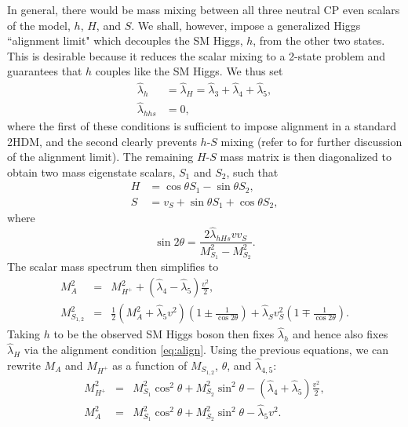 In general, there would be mass mixing between all three neutral CP even scalars of the model, $h$, $H$, and $S$. We shall, however, impose a generalized Higgs ``alignment limit" which decouples the SM Higgs, $h$, from the other two states. This is desirable because it reduces the scalar mixing to a 2-state problem and guarantees that $h$ couples like the SM Higgs. We thus set
\begin{align}
  \label{eq:align}  \hat{\lambda}_h &= \hat{\lambda}_H = \hat{\lambda}_3 + \hat{\lambda}_4 + \hat{\lambda}_5, \\
    \hat{\lambda}_{hhs} &= 0,
\end{align}
where the first of these conditions is sufficient to impose alignment in a standard 2HDM, and the second clearly prevents $h$-$S$ mixing (refer to \citep{Bell:2017rgi} for further discussion of the alignment limit).
%
The remaining $H$-$S$ mass matrix is then diagonalized to obtain two mass eigenstate scalars, $S_1$ and $S_2$, such that
\begin{align}
H &= \cos\theta S_1 - \sin\theta S_2,\\
S &= v_S + \sin\theta S_1 + \cos\theta S_2,
\end{align}
where 
\begin{equation}
\sin2\theta = \frac{2 \hat{\lambda}_{hHs} v v_S }{M_{S_1}^2-M_{S_2}^2}.
\end{equation}
The scalar mass spectrum then simplifies to
\begin{eqnarray}
M_A^2 &=& M_{H^+}^2 + \left(
  \hat{\lambda}_4-\hat{\lambda}_5 \right)\frac{v^2}{2} ,\\
\label{MS12} M_{S_{1,2}}^2 &=&
\frac{1}{2}\left(M_A^2+\hat{\lambda}_5 v^2\right)\left(1\pm \frac{1}{\cos
  2\theta}\right) + \hat{\lambda}_S v_S^2\left(1\mp \frac{1}{\cos
  2\theta}\right). 
\end{eqnarray}
Taking $h$ to be the observed SM Higgs boson then fixes $\hat{\lambda}_h$ and hence also fixes $\hat{\lambda}_H$ via the alignment condition \eqref{eq:align}. Using the previous equations, we can rewrite $M_A$ and $M_{H^+}$ as a function of $M_{S_{1,2}}$, $\theta$, and $\hat{\lambda}_{4,5}$:
\begin{eqnarray}
M_{H^+}^2 &=&  M_{S_1}^2\cos^2\theta + M_{S_2}^2\sin^2\theta - \left(
  \hat{\lambda}_4+\hat{\lambda}_5 \right)\frac{v^2}{2},\\
M_A^2 &=& M_{S_1}^2\cos^2\theta + M_{S_2}^2\sin^2\theta -\hat{\lambda}_5 v^2.
\end{eqnarray}  

